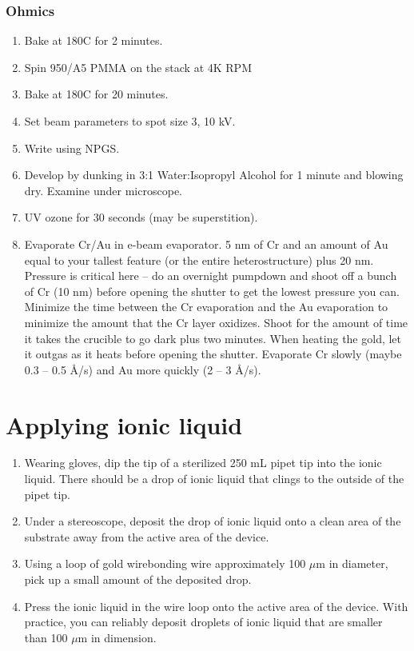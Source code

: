 \begin{appendices}
\subsubsection{Ohmics}
\begin{enumerate}
	\item Bake at 180C for 2 minutes.
	\item Spin 950/A5 PMMA on the stack at 4K RPM
	\item Bake at 180C for 20 minutes.
	\item Set beam parameters to spot size 3, 10 kV.
	\item Write using NPGS.
	\item Develop by dunking in 3:1 Water:Isopropyl Alcohol for 1 minute and blowing dry. Examine under microscope.
	\item UV ozone for 30 seconds (may be superstition).
	\item Evaporate Cr/Au in e-beam evaporator. 5 nm of Cr and an amount of Au equal to your tallest feature (or the entire heterostructure) plus 20 nm. Pressure is critical here – do an overnight pumpdown and shoot off a bunch of Cr (10 nm) before opening the shutter to get the lowest pressure you can. Minimize the time between the Cr evaporation and the Au evaporation to minimize the amount that the Cr layer oxidizes. Shoot for the amount of time it takes the crucible to go dark plus two minutes. When heating the gold, let it outgas as it heats before opening the shutter. Evaporate Cr slowly (maybe 0.3 – 0.5 \AA /s) and Au more quickly (2 – 3 \AA /s).
\end{enumerate}

\section{Applying ionic liquid}
\begin{enumerate}
	\item Wearing gloves, dip the tip of a sterilized 250 mL pipet tip into the ionic liquid. There should be a drop of ionic liquid that clings to the outside of the pipet tip.
	\item Under a stereoscope, deposit the drop of ionic liquid onto a clean area of the substrate away from the active area of the device.
	\item Using a loop of gold wirebonding wire approximately 100 $\mu$m in diameter, pick up a small amount of the deposited drop.
	\item Press the ionic liquid in the wire loop onto the active area of the device. With practice, you can reliably deposit droplets of ionic liquid that are smaller than 100 $\mu$m in dimension.
\end{enumerate}


\end{appendices}
